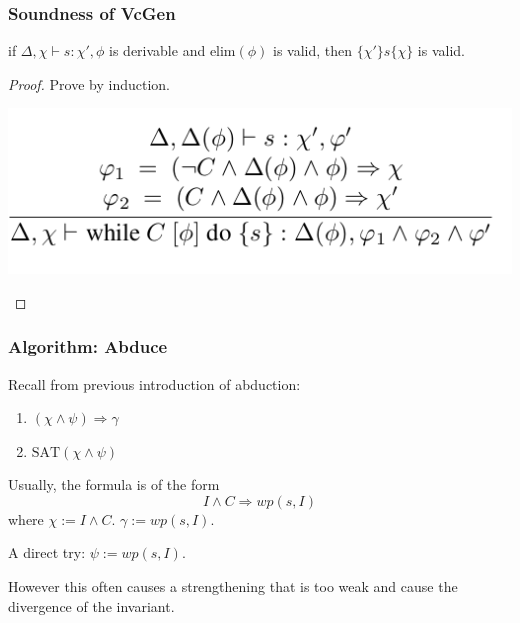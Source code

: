 \documentclass[11pt]{beamer}
\begin{document}
\begin{frame}\frametitle{Soundness of VcGen}

\begin{theorem}[Soundness]
if $\Delta, \chi \vdash s : \chi', \phi$ is derivable and $\text{elim}(\phi)$ is valid, then $\{\chi'\}s\{\chi\}$ is valid.
\end{theorem}
\begin{proof}

Prove by induction.
\begin{center}
\includegraphics[scale=0.4]{loop.png}
\end{center}
\end{proof}
\end{frame}

\begin{frame}\frametitle{Algorithm: Abduce}
Recall from previous introduction of abduction: 
\begin{enumerate}
\item $(\chi\wedge \psi )\Rightarrow \gamma$

\item $\text{SAT}(\chi\wedge \psi)$
\end{enumerate}

Usually, the formula is of the form 
\[I \wedge C \Rightarrow wp(s, I)\] 
where $\chi := I \wedge C$. $\gamma := wp(s, I)$.



A direct try:  $\psi := wp(s, I)$. 

However this often causes a strengthening that is too weak and cause the divergence of the invariant.

\end{frame}
\end{document}
